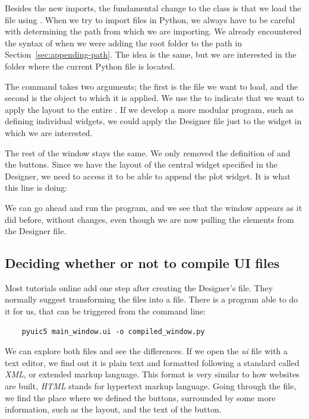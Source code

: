 Besides the new imports, the fundamental change to the  class is that we load the file using . When we try to import files in Python, we always have to be careful with determining the path from which we are importing. We already encountered the syntax of  when we were adding the root folder to the path in Section~\ref{sec:appending-path}. The idea is the same, but we are interested in the folder where the current Python file is located.

The command  takes two arguments; the first is the file we want to load, and the second is the object to which it is applied. We use the  to indicate that we want to apply the layout to the entire . If we develop a more modular program, such as defining individual widgets, we could apply the Designer file just to the widget in which we are interested.

The rest of the window stays the same. We only removed the definition of  and the buttons. Since we have the layout of the central widget specified in the Designer, we need to access it to be able to append the plot widget. It is what this line is doing:


We can go ahead and run the program, and we see that the window appears as it did before, without changes, even though we are now pulling the elements from the Designer file.

\subsection{Deciding whether or not to compile UI files}\label{subsec:compiling-or-not-compiling-ui-files}
Most tutorials online add one step after creating the Designer's file. They normally suggest transforming the  files into a  file. There is a program able to do it for us, that can be triggered from the command line:

\begin{verbatim}
    pyuic5 main_window.ui -o compiled_window.py
\end{verbatim}

We can explore both files and see the differences. If we open the \emph{ui} file with a text editor, we find out it is plain text and formatted following a standard called \emph{XML}, or extended markup language. This format is very similar to how websites are built, \emph{HTML} stands for hypertext markup language. Going through the file, we find the place where we defined the buttons, surrounded by some more information, such as the layout, and the text of the button.

